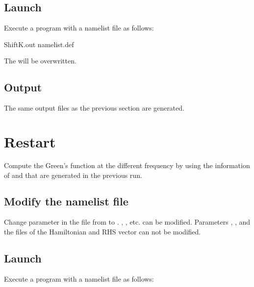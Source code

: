 \documentclass[letterpaper,10pt,dvipdfmx,openany,english]{sphinxmanual}
\begin{document}
\subsection{Launch}
\label{\detokenize{shiftk_flow_en:id1}}
Execute a program  with a namelist file 
as follows:

\begin{sphinxVerbatim}[commandchars=\\\{\}]
\PYGZdl{} ShiftK.out namelist.def
\end{sphinxVerbatim}

The  will be overwritten.


\subsection{Output}
\label{\detokenize{shiftk_flow_en:id2}}
The same output files as the previous section are generated.


\section{Restart}
\label{\detokenize{shiftk_flow_en:restart}}
Compute the Green’s function at the different frequency by using the information
of  and 
that are generated in the previous run.


\subsection{Modify the namelist file}
\label{\detokenize{shiftk_flow_en:id3}}
Change  parameter in the file 
from  to .
, , etc. can be modified.
Parameters  ,  , and the files of the Hamiltonian
and RHS vector can not be modified.


\subsection{Launch}
\label{\detokenize{shiftk_flow_en:id4}}
Execute a program  with a namelist file 
as follows:
\end{document}
